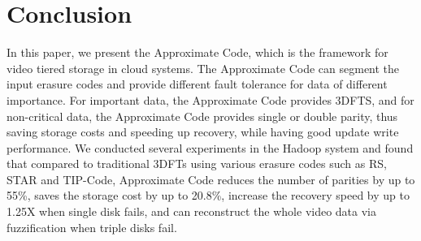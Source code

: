 \documentclass[sigconf]{acmart}
\begin{document}
\section{Conclusion}\label{Conclusion}
In this paper, we present the Approximate Code, which is the framework for video tiered storage in cloud systems. The Approximate Code can segment the input erasure codes and provide different fault tolerance for data of different importance. For important data, the Approximate Code provides 3DFTS, and for non-critical data, the Approximate Code provides single or double parity, thus saving storage costs and speeding up recovery, while having good update write performance. We conducted several experiments in the Hadoop system and found that compared to traditional 3DFTs using various erasure codes such as RS, STAR and TIP-Code, Approximate Code reduces the number of parities by up to 55\%, saves the storage cost by up to 20.8\%, increase the recovery speed by up to 1.25X when single disk fails, and can reconstruct the whole video data via fuzzification when triple disks fail.

\begin{acks}

\end{acks}





\end{document}
